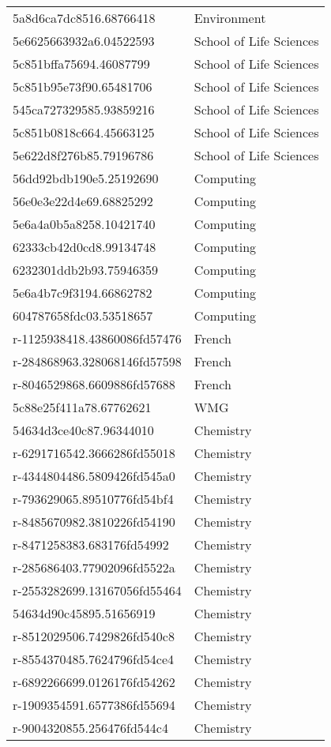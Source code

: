 \begin{tabular}{ll}
5a8d6ca7dc8516.68766418 & Environment \\
5e6625663932a6.04522593 & School of Life Sciences \\
5c851bffa75694.46087799 & School of Life Sciences \\
5c851b95e73f90.65481706 & School of Life Sciences \\
545ca727329585.93859216 & School of Life Sciences \\
5c851b0818c664.45663125 & School of Life Sciences \\
5e622d8f276b85.79196786 & School of Life Sciences \\
56dd92bdb190e5.25192690 & Computing \\
56e0e3e22d4e69.68825292 & Computing \\
5e6a4a0b5a8258.10421740 & Computing \\
62333cb42d0cd8.99134748 & Computing \\
6232301ddb2b93.75946359 & Computing \\
5e6a4b7c9f3194.66862782 & Computing \\
604787658fdc03.53518657 & Computing \\
r-1125938418.43860086fd57476 & French \\
r-284868963.328068146fd57598 & French \\
r-8046529868.6609886fd57688 & French \\
5c88e25f411a78.67762621 & WMG \\
54634d3ce40c87.96344010 & Chemistry \\
r-6291716542.3666286fd55018 & Chemistry \\
r-4344804486.5809426fd545a0 & Chemistry \\
r-793629065.89510776fd54bf4 & Chemistry \\
r-8485670982.3810226fd54190 & Chemistry \\
r-8471258383.683176fd54992 & Chemistry \\
r-285686403.77902096fd5522a & Chemistry \\
r-2553282699.13167056fd55464 & Chemistry \\
54634d90c45895.51656919 & Chemistry \\
r-8512029506.7429826fd540c8 & Chemistry \\
r-8554370485.7624796fd54ce4 & Chemistry \\
r-6892266699.0126176fd54262 & Chemistry \\
r-1909354591.6577386fd55694 & Chemistry \\
r-9004320855.256476fd544c4 & Chemistry \\

\end{tabular}

